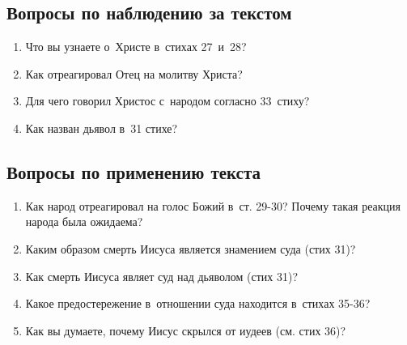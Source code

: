 \documentclass[a4paper,12pt]{article}
\begin{document}
\subsection*{Вопросы по наблюдению за текстом}
\begin{enumerate}
    \item Что вы узнаете о~Христе в~стихах 27~и~28? 
    
    \myline
    
    \myline
    \item Как отреагировал Отец на молитву Христа? 
    
    \myline
    
    \myline
    \item Для чего говорил Христос с~народом согласно 33~стиху? 
    
    \myline
    
    \myline
    \item Как назван дьявол в~31 стихе? 
    
    \myline
    
    \myline
\end{enumerate}

\subsection*{Вопросы по применению текста} 
\begin{enumerate}
    \item Как народ отреагировал на голос Божий в~ст. 29-30? Почему такая реакция народа была ожидаема? 
    
    \myline
    
    \myline
    \item Каким образом смерть Иисуса является знамением суда (стих 31)? 
    
    \myline
    
    \myline
    \item Как смерть Иисуса являет суд над дьяволом (стих 31)? 
    
    \myline
    
    \myline
    \item Какое предостережение в~отношении суда находится в~стихах 35-36? 
    
    \myline
    
    \myline
    \item Как вы думаете, почему Иисус скрылся от иудеев (см. стих 36)? 
    
    \myline
    
    \myline
\end{enumerate}
\end{document}
